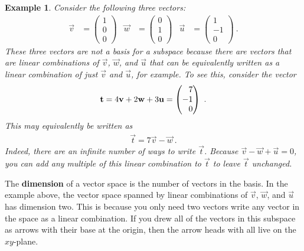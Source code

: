 \documentclass[12pt]{article}
\newtheorem{example}{Example}[section]
\begin{document}
\begin{example}\label{eg:over:specified:basis}
Consider the following three vectors:
\begin{align}
    \vec{v} &=
    \begin{pmatrix}
        1\\0\\0
    \end{pmatrix}
    &
    \vec{w} &=
    \begin{pmatrix}
        0\\1\\0
    \end{pmatrix}
    &
    \vec{u} &=
    \begin{pmatrix}
        1\\-1\\0
    \end{pmatrix} \ .
    \label{eq:tvu:example:basis}
\end{align}
These three vectors are \emph{not} a basis for a subspace because there are vectors that are linear combinations of $\vec{v}$, $\vec{w}$, and $\vec{u}$ that can be equivalently written as a linear combination of just $\vec{v}$ and $\vec{u}$, for example.
% 
To see this, consider the vector
\begin{align}
    \vec{t} = 4\vec{v} + 2\vec{w} + 3\vec{u} 
    =
    \begin{pmatrix}
        \pp 7 \\ -1 \\ \pp 0
    \end{pmatrix} \ .
\end{align}
This may equivalently be written as
\begin{align}
    \vec{t} = 7\vec{v} - \vec{w} \ .
\end{align}
Indeed, there are an infinite number of ways to write $\vec{t}$. Because $\vec{v} - \vec{w} + \vec{u} = 0$, you can add any multiple of this linear combination to $\vec{t}$ to leave $\vec{t}$ unchanged.
\end{example}

The \textbf{dimension} of a vector space is the number of vectors in the basis. In the example above, the vector space spanned by linear combinations of $\vec{v}$, $\vec{w}$, and $\vec{u}$ has dimension two. This is because you only need two vectors write any vector in the space as a linear combination. If you drew all of the vectors in this subspace as arrows with their base at the origin, then the arrow heads with all live on the $xy$-plane.
\end{document}
